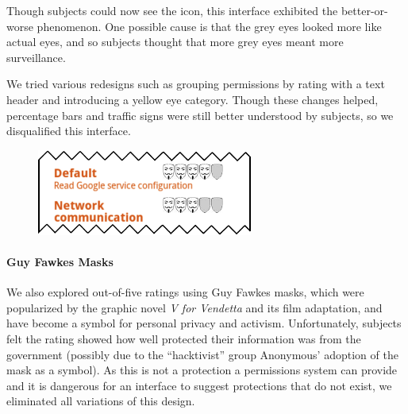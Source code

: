 \documentclass[11pt]{article}
\newcommand{\refsec}[1]{Section~\ref{#1}}
\begin{document}
Though subjects could now see the icon, this interface exhibited 
the better-or-worse phenomenon. One possible cause is that 
the grey eyes looked more like actual eyes, and so subjects thought that more 
grey eyes meant more surveillance. 

We tried various redesigns such as grouping permissions by rating with a
text header 
and introducing a yellow eye category. Though these changes helped, 
percentage bars 
and traffic signs 
were still better understood by subjects,
so we disqualified this interface.


\begin{figure}
\begin{center}
\includegraphics[width=.9\linewidth]{candidate-img/masks/masksR1.png}
\end{center}
\end{figure}

\paragraph{Guy Fawkes Masks}
\label{s-sec-masks}

We also explored out-of-five ratings using Guy Fawkes masks, which 
were popularized by the graphic novel \emph{V for Vendetta} and its
film adaptation, and have become a symbol for personal
privacy and activism.
\label{ss-sec-masks-r1}
Unfortunately, subjects felt the
rating showed how well protected their information was from the government 
(possibly due to the ``hacktivist'' group Anonymous' adoption of the mask as a symbol). 
As this is not a protection a permissions system can provide and it is dangerous for an
interface to suggest protections that do not exist, we eliminated all
variations of this design.
\end{document}

